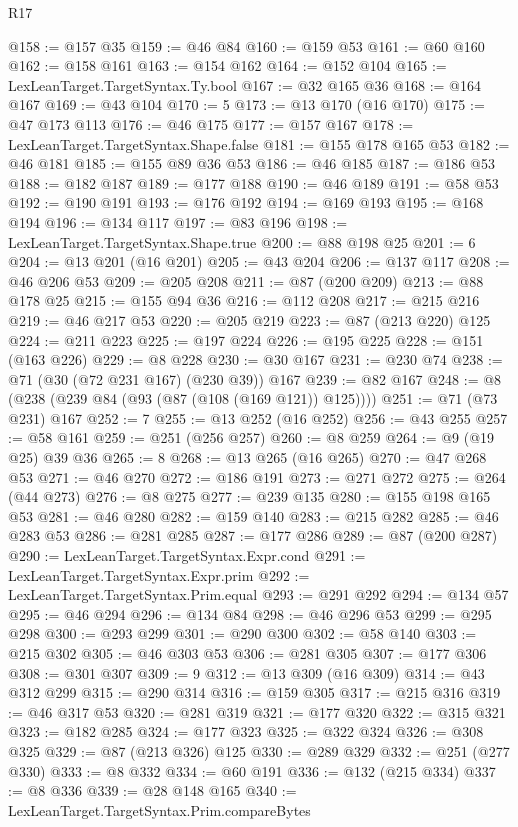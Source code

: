 \begin{lexlean}{R17}
\begin{coremodule}
@158 := @157 @35
@159 := @46 @84
@160 := @159 @53
@161 := @60 @160
@162 := @158 @161
@163 := @154 @162
@164 := @152 @104
@165 := LexLeanTarget.TargetSyntax.Ty.bool
@167 := @32 @165 @36
@168 := @164 @167
@169 := @43 @104
@170 := 5
@173 := @13 @170 (@16 @170)
@175 := @47 @173 @113
@176 := @46 @175
@177 := @157 @167
@178 := LexLeanTarget.TargetSyntax.Shape.false
@181 := @155 @178 @165 @53
@182 := @46 @181
@185 := @155 @89 @36 @53
@186 := @46 @185
@187 := @186 @53
@188 := @182 @187
@189 := @177 @188
@190 := @46 @189
@191 := @58 @53
@192 := @190 @191
@193 := @176 @192
@194 := @169 @193
@195 := @168 @194
@196 := @134 @117
@197 := @83 @196
@198 := LexLeanTarget.TargetSyntax.Shape.true
@200 := @88 @198 @25
@201 := 6
@204 := @13 @201 (@16 @201)
@205 := @43 @204
@206 := @137 @117
@208 := @46 @206 @53
@209 := @205 @208
@211 := @87 (@200 @209)
@213 := @88 @178 @25
@215 := @155 @94 @36
@216 := @112 @208
@217 := @215 @216
@219 := @46 @217 @53
@220 := @205 @219
@223 := @87 (@213 @220) @125
@224 := @211 @223
@225 := @197 @224
@226 := @195 @225
@228 := @151 (@163 @226)
@229 := @8 @228
@230 := @30 @167
@231 := @230 @74
@238 := @71 (@30 (@72 @231 @167) (@230 @39)) @167
@239 := @82 @167
@248 := @8 (@238 (@239 @84 (@93 (@87 (@108 (@169 @121)) @125))))
@251 := @71 (@73 @231) @167
@252 := 7
@255 := @13 @252 (@16 @252)
@256 := @43 @255
@257 := @58 @161
@259 := @251 (@256 @257)
@260 := @8 @259
@264 := @9 (@19 @25) @39 @36
@265 := 8
@268 := @13 @265 (@16 @265)
@270 := @47 @268 @53
@271 := @46 @270
@272 := @186 @191
@273 := @271 @272
@275 := @264 (@44 @273)
@276 := @8 @275
@277 := @239 @135
@280 := @155 @198 @165 @53
@281 := @46 @280
@282 := @159 @140
@283 := @215 @282
@285 := @46 @283 @53
@286 := @281 @285
@287 := @177 @286
@289 := @87 (@200 @287)
@290 := LexLeanTarget.TargetSyntax.Expr.cond
@291 := LexLeanTarget.TargetSyntax.Expr.prim
@292 := LexLeanTarget.TargetSyntax.Prim.equal
@293 := @291 @292
@294 := @134 @57
@295 := @46 @294
@296 := @134 @84
@298 := @46 @296 @53
@299 := @295 @298
@300 := @293 @299
@301 := @290 @300
@302 := @58 @140
@303 := @215 @302
@305 := @46 @303 @53
@306 := @281 @305
@307 := @177 @306
@308 := @301 @307
@309 := 9
@312 := @13 @309 (@16 @309)
@314 := @43 @312 @299
@315 := @290 @314
@316 := @159 @305
@317 := @215 @316
@319 := @46 @317 @53
@320 := @281 @319
@321 := @177 @320
@322 := @315 @321
@323 := @182 @285
@324 := @177 @323
@325 := @322 @324
@326 := @308 @325
@329 := @87 (@213 @326) @125
@330 := @289 @329
@332 := @251 (@277 @330)
@333 := @8 @332
@334 := @60 @191
@336 := @132 (@215 @334)
@337 := @8 @336
@339 := @28 @148 @165
@340 := LexLeanTarget.TargetSyntax.Prim.compareBytes

\end{coremodule}
\end{lexlean}
